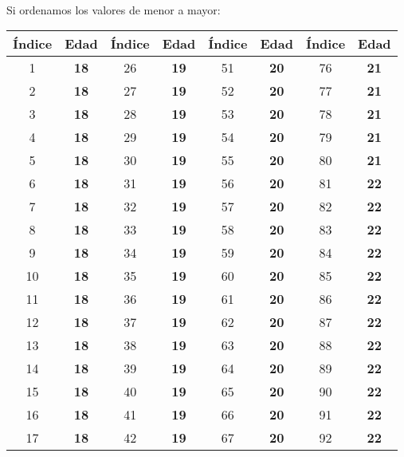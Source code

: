 \documentclass{article}
\begin{document}
\hfill\\
Si ordenamos los valores de menor a mayor:
\begin{table}[h!]
    \centering
    \begin{tabular}{|c|c|c|c|c|c|c|c|}
    \hline
    \textbf{Índice} & \textbf{Edad} & \textbf{Índice} & \textbf{Edad} & \textbf{Índice} & \textbf{Edad} & \textbf{Índice} & \textbf{Edad} \\ \hline
    1 & \textbf{18} & 26 & \textbf{19} & 51 & \textbf{20} & 76 & \textbf{21} \\ \hline
    2 & \textbf{18} & 27 & \textbf{19} & 52 & \textbf{20} & 77 & \textbf{21} \\ \hline
    3 & \textbf{18} & 28 & \textbf{19} & 53 & \textbf{20} & 78 & \textbf{21} \\ \hline
    4 & \textbf{18} & 29 & \textbf{19} & 54 & \textbf{20} & 79 & \textbf{21} \\ \hline
    5 & \textbf{18} & 30 & \textbf{19} & 55 & \textbf{20} & 80 & \textbf{21} \\ \hline
    6 & \textbf{18} & 31 & \textbf{19} & 56 & \textbf{20} & 81 & \textbf{22} \\ \hline
    7 & \textbf{18} & 32 & \textbf{19} & 57 & \textbf{20} & 82 & \textbf{22} \\ \hline
    8 & \textbf{18} & 33 & \textbf{19} & 58 & \textbf{20} & 83 & \textbf{22} \\ \hline
    9 & \textbf{18} & 34 & \textbf{19} & 59 & \textbf{20} & 84 & \textbf{22} \\ \hline
    10 & \textbf{18} & 35 & \textbf{19} & 60 & \textbf{20} & 85 & \textbf{22} \\ \hline
    11 & \textbf{18} & 36 & \textbf{19} & 61 & \textbf{20} & 86 & \textbf{22} \\ \hline
    12 & \textbf{18} & 37 & \textbf{19} & 62 & \textbf{20} & 87 & \textbf{22} \\ \hline
    13 & \textbf{18} & 38 & \textbf{19} & 63 & \textbf{20} & 88 & \textbf{22} \\ \hline
    14 & \textbf{18} & 39 & \textbf{19} & 64 & \textbf{20} & 89 & \textbf{22} \\ \hline
    15 & \textbf{18} & 40 & \textbf{19} & 65 & \textbf{20} & 90 & \textbf{22} \\ \hline
    16 & \textbf{18} & 41 & \textbf{19} & 66 & \textbf{20} & 91 & \textbf{22} \\ \hline
    17 & \textbf{18} & 42 & \textbf{19} & 67 & \textbf{20} & 92 & \textbf{22} \\ \hline

\end{tabular}
\end{table}
\end{document}

